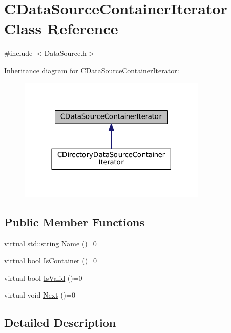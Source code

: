 \hypertarget{classCDataSourceContainerIterator}{}\section{C\+Data\+Source\+Container\+Iterator Class Reference}
\label{classCDataSourceContainerIterator}


{\ttfamily \#include $<$Data\+Source.\+h$>$}



Inheritance diagram for C\+Data\+Source\+Container\+Iterator\+:\nopagebreak
\begin{figure}[H]
\begin{center}
\leavevmode
\includegraphics[width=254pt]{classCDataSourceContainerIterator__inherit__graph}
\end{center}
\end{figure}
\subsection*{Public Member Functions}
\begin{DoxyCompactItemize}
\item 
virtual std\+::string \hyperlink{classCDataSourceContainerIterator_a95b57204a76fab1d5a75a01189d5fcc5}{Name} ()=0
\item 
virtual bool \hyperlink{classCDataSourceContainerIterator_aafcccb5733f936b03e1930b09c02df87}{Is\+Container} ()=0
\item 
virtual bool \hyperlink{classCDataSourceContainerIterator_ad1e2a9c6bde2f80ed03cb45085ce0441}{Is\+Valid} ()=0
\item 
virtual void \hyperlink{classCDataSourceContainerIterator_a2a9cc99d17cd217727ac4ab5e78f1a35}{Next} ()=0
\end{DoxyCompactItemize}


\subsection{Detailed Description}


